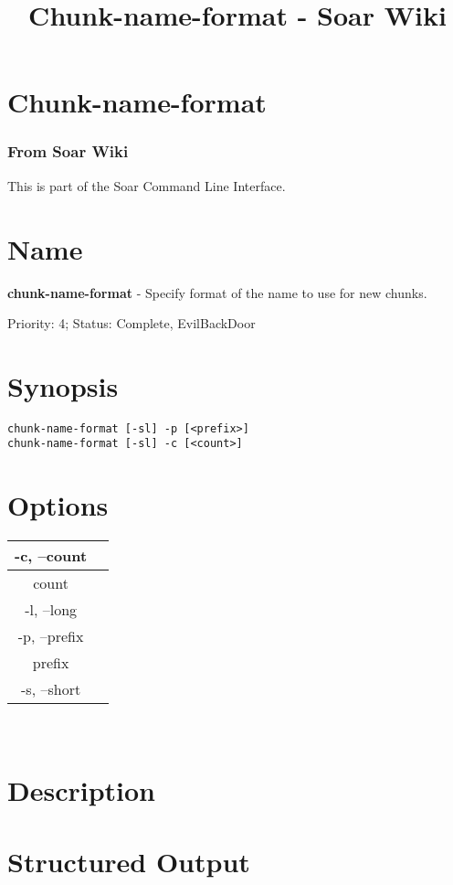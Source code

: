\documentclass[10pt]{article}
\title{Chunk-name-format - Soar Wiki}
\begin{document}
\section*{Chunk-name-format}
\subsubsection*{From Soar Wiki}


 This is part of the Soar Command Line Interface. 
\section*{ Name }


 \textbf{chunk-name-format}
 - Specify format of the name to use for new chunks. 


 Priority: 4; Status: Complete, EvilBackDoor
\section*{ Synopsis }
\begin{verbatim}
chunk-name-format [-sl] -p [<prefix>]
chunk-name-format [-sl] -c [<count>]

\end{verbatim}
\section*{ Options }


\begin{tabular}{|c|c|}
\hline 
 -c, --count  & \\
 \hline 
 count  & \\
 \hline 
 -l, --long  & \\
 \hline 
 -p, --prefix  & \\
 \hline 
 prefix  & \\
 \hline 
 -s, --short  & \\
 \hline 

\end{tabular}



 \\ 

\section*{ Description }
\section*{ Structured Output }
\end{document}
